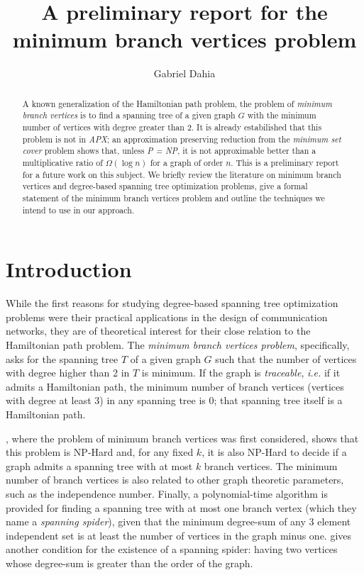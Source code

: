 \documentclass[12pt]{article}
\title{A preliminary report for the minimum branch vertices problem}
\author{Gabriel Dahia\inst{1}}
\begin{document}
 

\maketitle

\begin{abstract}
  A known generalization of the Hamiltonian path problem, the problem of \emph{minimum branch vertices} is to find a spanning tree of a given graph $G$ with the minimum number of vertices with degree greater than 2.
  It is already estabilished that this problem is not in \emph{APX}; an approximation preserving reduction from the \emph{minimum set cover} problem shows that, unless \emph{P = NP}, it is not approximable better than a multiplicative ratio of $\Omega(\log n )$ for a graph of order $n$.
  This is a preliminary report for a future work on this subject.
  We briefly review the literature on minimum branch vertices and degree-based spanning tree optimization problems, give a formal statement of the minimum branch vertices problem and outline the techniques we intend to use in our approach.
\end{abstract}
     
\section{Introduction}

While the first reasons for studying degree-based spanning tree optimization problems were their practical applications in the design of communication networks, they are of theoretical interest for their close relation to the Hamiltonian path problem.
The \emph{minimum branch vertices problem}, specifically, asks for the spanning tree $T$ of a given graph $G$ such that the number of vertices with degree higher than 2 in $T$ is minimum.
If the graph is \emph{traceable}, \emph{i.e.} if it admits a Hamiltonian path, the minimum number of branch vertices (vertices with degree at least 3) in any spanning tree is 0; that spanning tree itself is a Hamiltonian path.

\cite{gargano2004}, where the problem of minimum branch vertices was first considered, shows that this problem is NP-Hard and, for any fixed $k$, it is also NP-Hard to decide if a graph admits a spanning tree with at most $k$ branch vertices. 
The minimum number of branch vertices is also related to other graph theoretic parameters, such as the independence number.
Finally, a polynomial-time algorithm is provided for finding a spanning tree with at most one branch vertex (which they name a \emph{spanning spider}), given that the minimum degree-sum of any 3 element independent set is at least the number of vertices in the graph minus one.
\cite{flandrin2008} gives another condition for the existence of a spanning spider: having two vertices whose degree-sum is greater than the order of the graph. 
\end{document}
